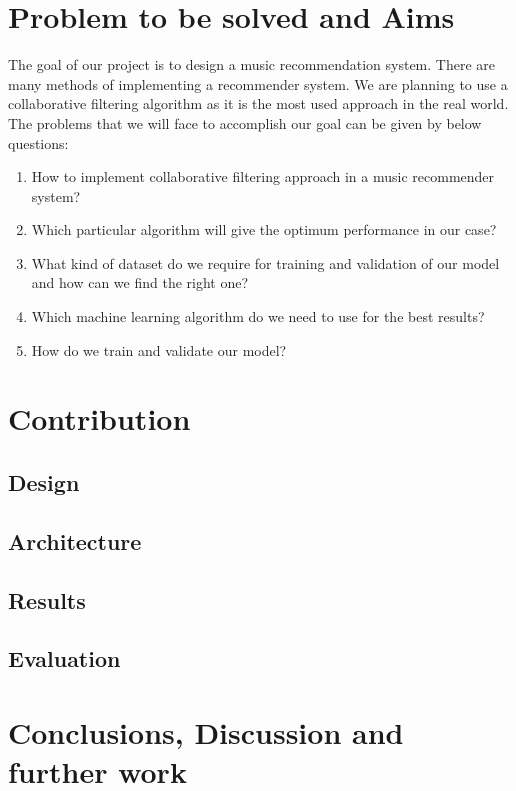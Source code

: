 \documentclass{jot}
\begin{document}
\section{Problem to be solved and Aims}
The goal of our project is to design a music recommendation system. There are many methods of implementing a recommender system. We are planning to use a collaborative filtering algorithm as it is the most used approach in the real world.
The problems that we will face to accomplish our goal can be given by below questions:
\begin{enumerate}
  \item How to implement collaborative filtering approach in a music recommender system?
  \item Which particular algorithm will give the optimum performance in our case?
  \item What kind of dataset do we require for training and validation of our model and how can we find the right one?
  \item Which machine learning algorithm do we need to use for the best results?
  \item How do we train and validate our model?
\end{enumerate}

\section{Contribution}

\subsection{Design}
\subsection{Architecture}
\subsection{Results}
\subsection{Evaluation}

\section{Conclusions, Discussion and further work}

\backmatter

\nocite{*}



\abouttheauthors
\end{document}
